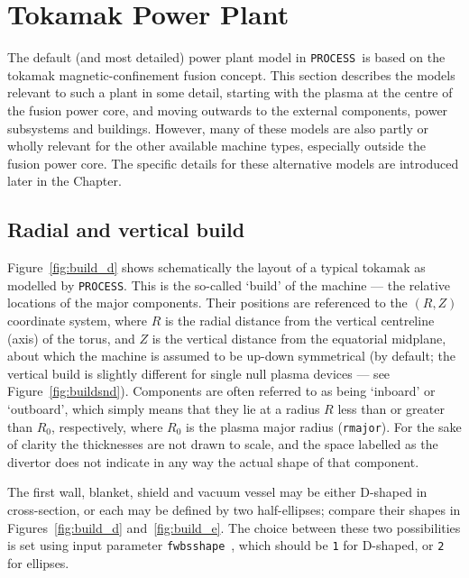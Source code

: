 \documentclass[11pt,a4paper]{report}
\newcommand{\process}{\mbox{\texttt{PROCESS}}}
\begin{document}
\section{Tokamak Power Plant}

The default (and most detailed) power plant model in \process\ is based on the
tokamak magnetic-confinement fusion concept. This section describes the models
relevant to such a plant in some detail, starting with the plasma at the
centre of the fusion power core, and moving outwards to the external
components, power subsystems and buildings. However, many of these models are
also partly or wholly relevant for the other available machine types,
especially outside the fusion power core. The specific details for these
alternative models are introduced later in the Chapter.

\subsection{Radial and vertical build}

Figure~\ref{fig:build_d} shows schematically the layout of a typical tokamak
as modelled by \process. This is the so-called `build' of the machine --- the
relative locations of the major components. Their positions are referenced to
the $(R,Z)$ coordinate system, where $R$ is the radial distance from the
vertical centreline (axis) of the torus, and $Z$ is the vertical distance from
the equatorial midplane, about which the machine is assumed to be up-down
symmetrical (by default; the vertical build is slightly different for single
null plasma devices --- see Figure~\ref{fig:buildsnd}). Components are often
referred to as being `inboard' or `outboard', which simply means that they lie
at a radius $R$ less than or greater than $R_0$, respectively, where $R_0$ is
the plasma major radius (\texttt{rmajor}). For the sake of clarity the
thicknesses are not drawn to scale, and the space labelled as the divertor
does not indicate in any way the actual shape of that component.

The first wall, blanket, shield and vacuum vessel may be either D-shaped in
cross-section, or each may be defined by two half-ellipses; compare their
shapes in Figures~\ref{fig:build_d} and~\ref{fig:build_e}. The choice between
these two possibilities is set using input parameter
\texttt{fwbsshape}~\cite{fwbsshape}, which should be \texttt{1} for D-shaped,
or \texttt{2} for ellipses.
\end{document}
